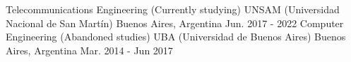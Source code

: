 

\begin{cventries}

    \cventry
    {Telecommunications Engineering (Currently studying)} %
    {UNSAM (Universidad Nacional de San Martín)} %
    {Buenos Aires, Argentina} %
    {Jun. 2017 - 2022} %
    {}
    \cventry
    {Computer Engineering (Abandoned studies)} %
    {UBA (Universidad de Buenos Aires)} %
    {Buenos Aires, Argentina} %
    {Mar. 2014 - Jun 2017}
    {}
\end{cventries}
